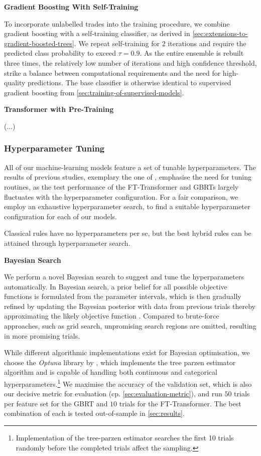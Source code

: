 \textbf{Gradient Boosting With Self-Training}

To incorporate unlabelled trades into the training procedure, we combine gradient boosting with a self-training classifier, as derived in \cref{sec:extensions-to-gradient-boosted-trees}. We repeat self-training for 2 iterations and require the predicted class probability to exceed $\tau=0.9$. As the entire ensemble is rebuilt three times, the relatively low number of iterations and high confidence threshold, strike a balance between computational requirements and the need for high-quality predictions. The base classifier is otherwise identical to supervised gradient boosting from \cref{sec:training-of-supervised-models}.

\textbf{Transformer with Pre-Training}

(...)

\subsubsection{Hyperparameter Tuning}\label{sec:hyperparameter-tuning}

All of our machine-learning models feature a set of tunable hyperparameters. The results of previous studies, exemplary the one of \textcite[][5]{grinsztajnWhyTreebasedModels2022}, emphasise the need for tuning routines, as the test performance of the FT-Transformer and \glspl{GBRT} largely fluctuates with the hyperparameter configuration. For a fair comparison, we employ an exhaustive hyperparameter search, to find a suitable hyperparameter configuration for each of our models.

Classical rules have no hyperparameters per se, but the best hybrid rules can be attained through hyperparameter search.

\textbf{Bayesian Search}

We perform a novel Bayesian search to suggest and tune the hyperparameters automatically. In Bayesian search, a prior belief for all possible objective functions is formulated from the parameter intervals, which is then gradually refined by updating the Bayesian posterior with data from previous trials thereby approximating the likely objective function \autocite[][2]{shahriariTakingHumanOut2016}. Compared to brute-force approaches, such as grid search, unpromising search regions are omitted, resulting in more promising trials.

While different algorithmic implementations exist for Bayesian optimisation, we choose the \emph{Optuna} library by \textcite[][1--10]{akibaOptunaNextgenerationHyperparameter2019}, which implements the tree parzen estimator algorithm and is capable of handling both continuous and categorical hyperparameters.\footnote{Implementation of the tree-parzen estimator searches the first 10 trials randomly before the completed trials affect the sampling.} We maximise the accuracy of the validation set, which is also our decisive metric for evaluation (cp. \cref{sec:evaluation-metric}), and run $\num{50}$ trials per feature set for the \gls{GBRT} and $\num{10}$ trials for the FT-Transformer. The best combination of each is tested out-of-sample in \cref{sec:results}.

